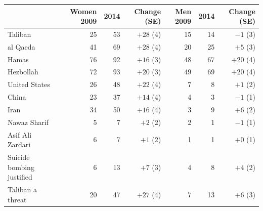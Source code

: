 \begin{tabular}{lrrrrrr}
\toprule
 & Women 2009 & 2014 & Change (SE) & Men 2009 & 2014 & Change (SE) \\
\midrule
Taliban & 25 & 53 & $+28$ (4) & 15 & 14 & $-1$ (3) \\
al Qaeda & 41 & 69 & $+28$ (4) & 20 & 25 & $+5$ (3) \\
Hamas & 76 & 92 & $+16$ (3) & 48 & 67 & $+20$ (4) \\
Hezbollah & 72 & 93 & $+20$ (3) & 49 & 69 & $+20$ (4) \\
\midrule
United States & 26 & 48 & $+22$ (4) & 7 & 8 & $+1$ (2) \\
China & 23 & 37 & $+14$ (4) & 4 & 3 & $-1$ (1) \\
Iran & 34 & 50 & $+16$ (4) & 3 & 9 & $+6$ (2) \\
Nawaz Sharif & 5 & 7 & $+2$ (2) & 2 & 1 & $-1$ (1) \\
Asif Ali Zardari & 6 & 7 & $+1$ (2) & 1 & 1 & $+0$ (1) \\
\midrule
Suicide bombing justified & 6 & 13 & $+7$ (3) & 4 & 8 & $+4$ (2) \\
Taliban a threat & 20 & 47 & $+27$ (4) & 7 & 13 & $+6$ (3) \\
\bottomrule
\end{tabular}
